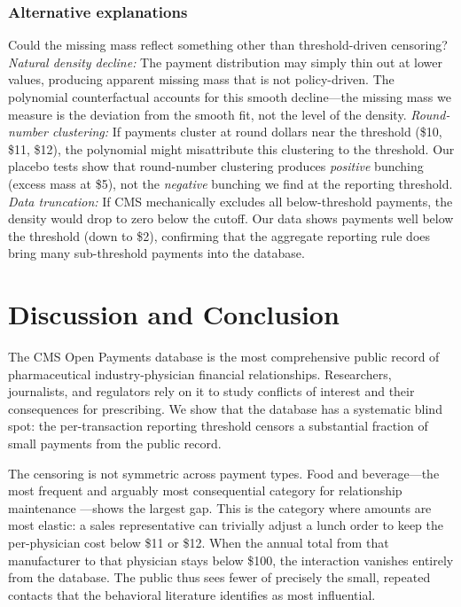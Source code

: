\documentclass[12pt]{article}
\begin{document}
\subsubsection*{Alternative explanations} Could the missing mass reflect something other than threshold-driven censoring? \emph{Natural density decline:} The payment distribution may simply thin out at lower values, producing apparent missing mass that is not policy-driven. The polynomial counterfactual accounts for this smooth decline---the missing mass we measure is the deviation from the smooth fit, not the level of the density. \emph{Round-number clustering:} If payments cluster at round dollars near the threshold (\$10, \$11, \$12), the polynomial might misattribute this clustering to the threshold. Our placebo tests show that round-number clustering produces \emph{positive} bunching (excess mass at \$5), not the \emph{negative} bunching we find at the reporting threshold. \emph{Data truncation:} If CMS mechanically excludes all below-threshold payments, the density would drop to zero below the cutoff. Our data shows payments well below the threshold (down to \$2), confirming that the aggregate reporting rule does bring many sub-threshold payments into the database.

\section{Discussion and Conclusion}

The CMS Open Payments database is the most comprehensive public record of pharmaceutical industry-physician financial relationships. Researchers, journalists, and regulators rely on it to study conflicts of interest and their consequences for prescribing. We show that the database has a systematic blind spot: the per-transaction reporting threshold censors a substantial fraction of small payments from the public record.

The censoring is not symmetric across payment types. Food and beverage---the most frequent and arguably most consequential category for relationship maintenance \citep{dejong2016pharmaceutical}---shows the largest gap. This is the category where amounts are most elastic: a sales representative can trivially adjust a lunch order to keep the per-physician cost below \$11 or \$12. When the annual total from that manufacturer to that physician stays below \$100, the interaction vanishes entirely from the database. The public thus sees fewer of precisely the small, repeated contacts that the behavioral literature identifies as most influential.
\end{document}
